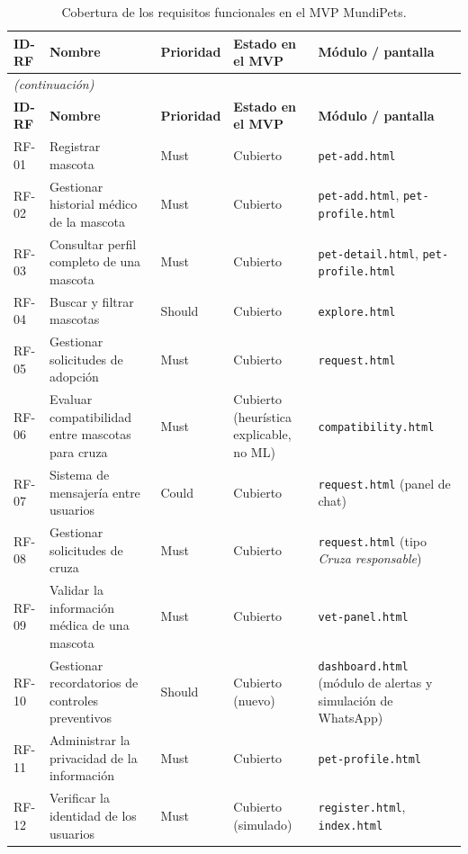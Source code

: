\documentclass[journal,onecolumn]{IEEEtran}
\begin{document}
	\begin{longtable}{@{}p{1.5cm} p{5.2cm} p{1.7cm} p{3.0cm} p{3.4cm}@{}}
		\caption{Cobertura de los requisitos funcionales en el MVP MundiPets.}
		\label{tab:cobertura-mvp} \\
		\hline
		\textbf{ID-RF} & \textbf{Nombre} & \textbf{Prioridad} & \textbf{Estado en el MVP} & \textbf{Módulo / pantalla} \\
		\hline
		\endfirsthead
		\multicolumn{5}{|l|}{\textit{(continuación)}} \\
		\hline
		\textbf{ID-RF} & \textbf{Nombre} & \textbf{Prioridad} & \textbf{Estado en el MVP} & \textbf{Módulo / pantalla} \\
		\hline
		\endhead
		\hline
		\endfoot
		RF-01 & Registrar mascota & Must & Cubierto & \texttt{pet-add.html} \\
		\hline
		RF-02 & Gestionar historial médico de la mascota & Must & Cubierto & \texttt{pet-add.html}, \texttt{pet-profile.html} \\
		\hline
		RF-03 & Consultar perfil completo de una mascota & Must & Cubierto & \texttt{pet-detail.html}, \texttt{pet-profile.html} \\
		\hline
		RF-04 & Buscar y filtrar mascotas & Should & Cubierto & \texttt{explore.html} \\
		\hline
		RF-05 & Gestionar solicitudes de adopción & Must & Cubierto & \texttt{request.html} \\
		\hline
		RF-06 & Evaluar compatibilidad entre mascotas para cruza & Must & Cubierto (heurística explicable, no ML) & \texttt{compatibility.html} \\
		\hline
		RF-07 & Sistema de mensajería entre usuarios & Could & Cubierto & \texttt{request.html} (panel de chat) \\
		\hline
		RF-08 & Gestionar solicitudes de cruza & Must & Cubierto & \texttt{request.html} (tipo \emph{Cruza responsable}) \\
		\hline
		RF-09 & Validar la información médica de una mascota & Must & Cubierto & \texttt{vet-panel.html} \\
		\hline
		RF-10 & Gestionar recordatorios de controles preventivos & Should & Cubierto (nuevo) & \texttt{dashboard.html} (módulo de alertas y simulación de WhatsApp) \\
		\hline
		RF-11 & Administrar la privacidad de la información & Must & Cubierto & \texttt{pet-profile.html} \\
		\hline
		RF-12 & Verificar la identidad de los usuarios & Must & Cubierto (simulado) & \texttt{register.html}, \texttt{index.html} \\

\end{longtable}
\end{document}
